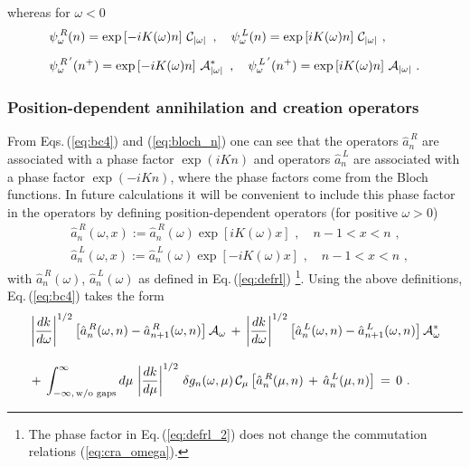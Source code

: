 %
whereas for $\omega<0$ 
%
\begin{equation} \label{eq:bloch_n_neg}
\begin{split}
& \psi_{\omega}^{\,R}(n) = \exp\left[- i K(\omega) n\right] \, {\cal C}_{|\omega|} \, \, \, , \quad
\psi_{\omega}^{\,L}(n) = \exp\left[i K(\omega) n\right] \, {\cal C}_{|\omega|} \, \, , \\[2mm]
& \psi_{\omega}^{\,R\,'}(n^+) = \exp\left[-i K(\omega) n\right] \, {\cal A}_{|\omega|}^* \, \, \, , \quad
\psi_{\omega}^{\,L\,'}(n^+) = \exp\left[i K(\omega) n\right] \, {\cal A}_{|\omega|} \, \, . 
\end{split}
\end{equation}
%




\subsubsection{Position-dependent annihilation and creation operators} \label{subsubsec:annihilation_creation}
%
From Eqs.\,(\ref{eq:bc4}) and (\ref{eq:bloch_n}) one can see that the 
operators $\hat{a}_n^{\,R}$ are associated with a phase factor $\exp(i K n)$ and 
operators $\hat{a}_n^{\,L}$ are associated with a phase factor $\exp(- i K n)$,
where the phase factors come from the Bloch functions.
In future calculations it will be convenient to include this phase factor in the 
operators by defining position-dependent operators (for positive $\omega>0$)
%
\begin{subequations} \label{eq:defrl_2}
\begin{eqnarray}
& \hat{a}_n^{\,R}(\omega,x) := \hat{a}_n^{\,R}(\omega) \exp\left[i K(\omega) x\right]  
\, \, , \quad n-1 < x < n \, \, , \\[2mm]
& \hat{a}_n^{\,L}(\omega,x) := \hat{a}_n^{\,L}(\omega) \exp\left[-i K(\omega) x\right] 
\, \, , \quad n-1 < x < n \, \, ,
\end{eqnarray}
\end{subequations}
%
with $\hat{a}_n^{\,R}(\omega)$, $\hat{a}_n^{\,L}(\omega)$ as defined in Eq.\,(\ref{eq:defrl})
%
\footnote{The phase factor in Eq.\,(\ref{eq:defrl_2}) does not change the 
commutation relations (\ref{eq:cra_omega}).}. 
%
Using the above definitions, Eq.\,(\ref{eq:bc4}) takes the form
%
\begin{equation} \label{eq:bc5}
\begin{split}
& \left| \frac{dk}{d\omega} \right|^{1/2} \left[ \hat{a}_n^{\,R}(\omega,n) - \hat{a}_{n+1}^{\,R}(\omega,n) \right] 
{\cal A}_{\omega} \, + \, 
\left| \frac{dk}{d\omega} \right|^{1/2} \left[ \hat{a}_n^{\,L}(\omega,n) - \hat{a}_{n+1}^{\,L}(\omega,n) \right] 
{\cal A}_{\omega}^* \\[3mm]
& + \, \int_{-\infty, \, \text{w/o gaps}}^{\infty} d\mu \, \left| \frac{dk}{d\mu} \right|^{1/2} \,
\delta g_n(\omega, \mu) \, {\cal C}_{\mu} 
\left[ \hat{a}_n^{\,R}(\mu,n) \, + \, \hat{a}_n^{\,L}(\mu,n) \right] \, = \, 0 \, \, .
\end{split}
\end{equation}
%




